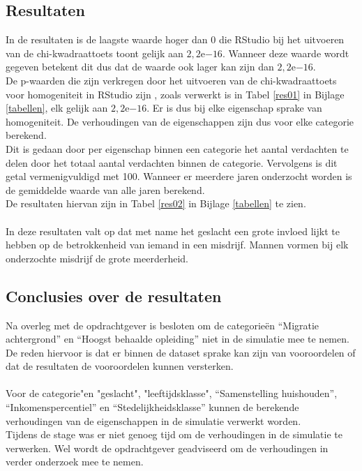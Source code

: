 \documentclass[12pt, letterpaper]{article}
\begin{document}
\subsection{Resultaten}
\noindent In de resultaten is de laagste waarde hoger dan 0 die RStudio bij het uitvoeren van de chi-kwadraattoets toont gelijk aan $2,2\mathrm{e}{-16}$. Wanneer deze waarde wordt gegeven betekent dit dus dat de waarde ook lager kan zijn dan $2,2\mathrm{e}{-16}$.
\\
De p-waarden die zijn verkregen door het uitvoeren van de chi-kwadraattoets voor homogeniteit in RStudio zijn , zoals verwerkt is in Tabel \ref{res01} in Bijlage \ref{tabellen}, elk gelijk aan $2,2\mathrm{e}{-16}$. Er is dus bij elke eigenschap sprake van homogeniteit. De verhoudingen van de eigenschappen zijn dus voor elke categorie berekend.
\\
Dit is gedaan door per eigenschap binnen een categorie het aantal verdachten te delen door het totaal aantal verdachten binnen de categorie. Vervolgens is dit getal vermenigvuldigd met 100. Wanneer er meerdere jaren onderzocht worden is de gemiddelde waarde van alle jaren berekend.\\
De resultaten hiervan zijn in Tabel \ref{res02} in Bijlage \ref{tabellen} te zien.
\\ \\
In deze resultaten valt op dat met name het geslacht een grote invloed lijkt te hebben op de betrokkenheid van iemand in een misdrijf. Mannen vormen bij elk onderzochte misdrijf de grote meerderheid.

\subsection{Conclusies over de resultaten}
Na overleg met de opdrachtgever is besloten om de categorieën “Migratie achtergrond” en “Hoogst behaalde opleiding” niet in de simulatie mee te nemen. De reden hiervoor is dat er binnen de dataset sprake kan zijn van vooroordelen of dat de resultaten de vooroordelen kunnen versterken. 
\\ \\
Voor de categorie"en "geslacht", "leeftijdsklasse", “Samenstelling huishouden”, “Inkomenspercentiel” en “Stedelijkheidsklasse” kunnen de berekende verhoudingen van de eigenschappen in de simulatie verwerkt worden.
\\ Tijdens de stage was er niet genoeg tijd om de verhoudingen in de simulatie te verwerken. Wel wordt de opdrachtgever geadviseerd om de verhoudingen in verder onderzoek mee te nemen.
\end{document}
